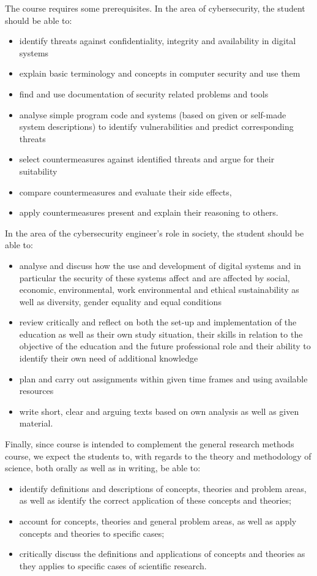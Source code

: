 The course requires some prerequisites.
In the area of cybersecurity, the student should be able to:
\begin{itemize}
  \item identify threats against confidentiality, integrity and availability in 
    digital systems
  \item explain basic terminology and concepts in computer security and use 
    them
  \item find and use documentation of security related problems and tools
  \item analyse simple program code and systems (based on given or self-made 
    system descriptions) to identify vulnerabilities and predict corresponding 
    threats
  \item select countermeasures against identified threats and argue for their 
    suitability
  \item compare countermeasures and evaluate their side effects,
  \item apply countermeasures present and explain their reasoning to others.
\end{itemize}

In the area of the cybersecurity engineer's role in society, the student should 
be able to:
\begin{itemize}
  \item analyse and discuss how the use and development of digital systems and 
    in particular the security of these systems affect and are affected by 
    social, economic, environmental, work environmental and ethical 
    sustainability as well as diversity, gender equality and equal conditions
  \item review critically and reflect on both the set-up and implementation of 
    the education as well as their own study situation, their skills in 
    relation to the objective of the education and the future professional role 
    and their ability to identify their own need of additional knowledge
  \item plan and carry out assignments within given time frames and using 
    available resources
  \item write short, clear and arguing texts based on own analysis as well as 
    given material.
\end{itemize}

Finally, since course is intended to complement the general research methods 
course, we expect the students to, with regards to the theory and  methodology 
of science, both orally as well as in writing, be able to:
\begin{itemize}
  \item identify definitions and descriptions of concepts, theories and problem 
    areas, as well as identify the correct application of these concepts and 
    theories;
  \item account for concepts, theories and general problem areas, as well as 
    apply concepts and theories to specific cases;
  \item critically discuss the definitions and applications of concepts and 
    theories as they applies to specific cases of scientific research.
\end{itemize}


